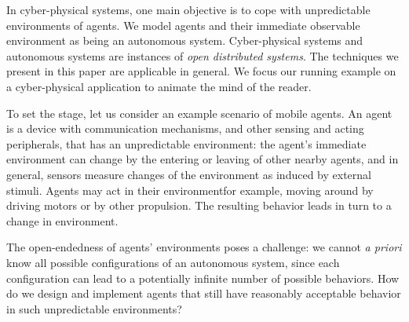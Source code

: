 \begin{abstract}
	
	
	
\end{abstract}


In cyber-physical systems, one main objective is to cope with unpredictable environments of agents.
We model agents and their immediate observable environment as being an autonomous system.
Cyber-physical systems and autonomous systems are instances of \emph{open distributed systems}.
The techniques we present in this paper are applicable in general.
We focus our running example on a cyber-physical application to animate the mind of the reader.

To set the stage, let us consider an example scenario of mobile agents.
An agent is a device with communication mechanisms,
and other sensing and acting peripherals,
that has an unpredictable environment:
the agent's immediate environment can change by the entering or leaving of other nearby agents,
and in general, sensors measure changes of the environment as induced by external stimuli.
Agents may act in their environment\textemdash for example,
moving around by driving motors or by other propulsion.
The resulting behavior leads in turn to a change in environment.

The open-endedness of agents' environments poses a challenge:
we cannot \emph{a priori} know all possible configurations of an autonomous system,
since each configuration can lead to a potentially infinite number of possible behaviors.
How do we design and implement agents that still have reasonably acceptable behavior
in such unpredictable environments?
